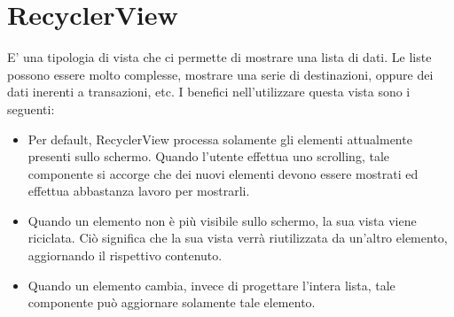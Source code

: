 \section{RecyclerView}
E' una tipologia di vista che ci permette di mostrare una lista di dati. Le liste possono essere molto complesse, mostrare una serie di destinazioni, oppure dei dati inerenti a transazioni, etc. I benefici nell'utilizzare questa vista sono i seguenti:
\begin{itemize}
\item Per default, RecyclerView processa solamente gli elementi attualmente presenti sullo schermo. Quando l'utente effettua uno scrolling, tale componente si accorge che dei nuovi elementi devono essere mostrati ed effettua abbastanza lavoro per mostrarli.
\item Quando un elemento non è più visibile sullo schermo, la sua vista viene riciclata. Ciò significa che la sua vista verrà riutilizzata da un'altro elemento, aggiornando il rispettivo contenuto.
\item Quando un elemento cambia, invece di progettare l'intera lista, tale componente può aggiornare solamente tale elemento.
\end{itemize}
